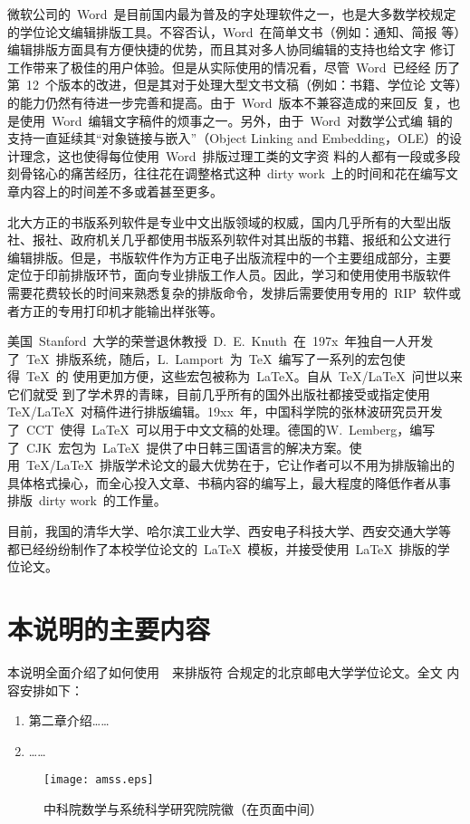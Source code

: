 微软公司的~Word~是目前国内最为普及的字处理软件之一，也是大多数学校规定
的学位论文编辑排版工具。不容否认，Word~在简单文书（例如：通知、简报
等）编辑排版方面具有方便快捷的优势，而且其对多人协同编辑的支持也给文字
修订工作带来了极佳的用户体验。但是从实际使用的情况看，尽管~Word~已经经
历了第~12~个版本的改进，但是其对于处理大型文书文稿（例如：书籍、学位论
文等）的能力仍然有待进一步完善和提高。由于~Word~版本不兼容造成的来回反
复，也是使用~Word~编辑文字稿件的烦事之一。另外，由于~Word~对数学公式编
辑的支持一直延续其“对象链接与嵌入”（Object Linking and
Embedding，OLE）的设计理念，这也使得每位使用~Word~排版过理工类的文字资
料的人都有一段或多段刻骨铭心的痛苦经历，往往花在调整格式这种~dirty
work~上的时间和花在编写文章内容上的时间差不多或着甚至更多。

北大方正的书版系列软件是专业中文出版领域的权威，国内几乎所有的大型出版
社、报社、政府机关几乎都使用书版系列软件对其出版的书籍、报纸和公文进行
编辑排版。但是，书版软件作为方正电子出版流程中的一个主要组成部分，主要
定位于印前排版环节，面向专业排版工作人员。因此，学习和使用使用书版软件
需要花费较长的时间来熟悉复杂的排版命令，发排后需要使用专用的~RIP~软件或
者方正的专用打印机才能输出样张等。

美国~Stanford~大学的荣誉退休教授~D.~E.~Knuth~在~197x~年独自一人开发
了~\TeX~排版系统，随后，L.~Lamport~为~\TeX~编写了一系列的宏包使得~\TeX~的
使用更加方便，这些宏包被称为~\LaTeX。自从~\TeX/\LaTeX~问世以来它们就受
到了学术界的青睐，目前几乎所有的国外出版社都接受或指定使用~
\TeX/\LaTeX~对稿件进行排版编辑。19xx~年，中国科学院的张林波研究员开发
了~CCT~使得~\LaTeX~可以用于中文文稿的处理。德国的W.~Lemberg，编写
了~CJK~宏包为~\LaTeX~提供了中日韩三国语言的解决方案。使
用~\TeX/\LaTeX~排版学术论文的最大优势在于，它让作者可以不用为排版输出的
具体格式操心，而全心投入文章、书稿内容的编写上，最大程度的降低作者从事
排版~dirty work~的工作量。

目前，我国的清华大学、哈尔滨工业大学、西安电子科技大学、西安交通大学等
都已经纷纷制作了本校学位论文的~\LaTeX~模板，并接受使用~\LaTeX~排版的学
位论文。

\section{本说明的主要内容}
本说明全面介绍了如何使用~\BUPTThesis~来排版符
合规定的北京邮电大学学位论文。全文
内容安排如下：

\begin{enumerate}
\item 第二章介绍……
\item ……
\end{enumerate}

\begin{figure}[h]
 \centering
 \texttt{[image: amss.eps]}
 \caption{中科院数学与系统科学研究院院徽（在页面中间）}
 \label{fig:amss1}
\end{figure}

\ifx\usechapbib\empty


\fi


